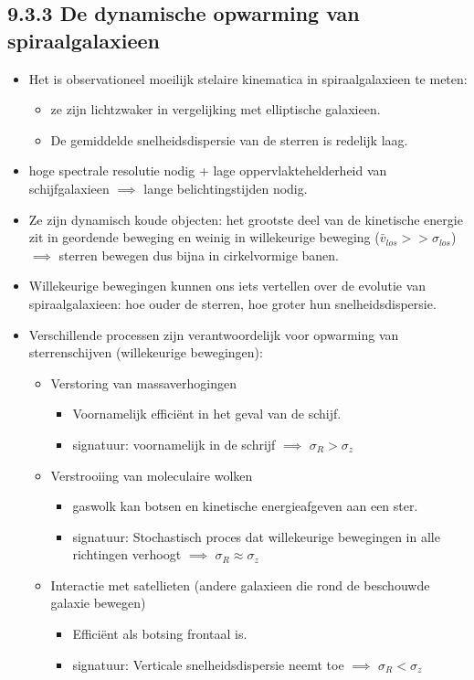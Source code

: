 \documentclass[10pt,a4paper]{article}
\begin{document}
\subsection*{9.3.3 De dynamische opwarming van spiraalgalaxieen}
\begin{itemize}
  \item Het is observationeel moeilijk stelaire kinematica in spiraalgalaxieen te meten:
  \begin{itemize}
    \item ze zijn lichtzwaker in vergelijking met elliptische galaxieen.
    \item  De gemiddelde snelheidsdispersie van de sterren is redelijk laag.
  \end{itemize} 
  \item hoge spectrale resolutie nodig + lage oppervlaktehelderheid van schijfgalaxieen $\implies$ lange belichtingstijden nodig.
  \item Ze zijn dynamisch koude objecten: het grootste deel van de kinetische energie zit in geordende beweging en weinig in willekeurige beweging ($\bar{v}_{los}>>\sigma_{los}$) $\implies$ sterren bewegen dus bijna in cirkelvormige banen.
  \item Willekeurige bewegingen kunnen ons iets vertellen over de evolutie van spiraalgalaxieen: hoe ouder de sterren, hoe groter hun snelheidsdispersie.
  \item Verschillende processen zijn verantwoordelijk voor opwarming van sterrenschijven (willekeurige bewegingen):
  \begin{itemize}
    \item Verstoring van massaverhogingen
    \begin{itemize}
      \item Voornamelijk efficiënt in het geval van de schijf.
      \item signatuur: voornamelijk in de schrijf $\implies$ $\sigma_R>\sigma_z$
    \end{itemize}
    \item Verstrooiing van moleculaire wolken
    \begin{itemize}
      \item gaswolk kan botsen en kinetische energieafgeven aan een ster.
      \item signatuur: Stochastisch proces dat willekeurige bewegingen in alle richtingen verhoogt $\implies$ $\sigma_R\approx\sigma_z$
    \end{itemize}
    \item Interactie met satellieten (andere galaxieen die rond de beschouwde galaxie bewegen)
    \begin{itemize}
      \item Efficiënt als botsing frontaal is.
      \item signatuur: Verticale snelheidsdispersie neemt toe $\implies$ $\sigma_R<\sigma_z$
    \end{itemize}
  \end{itemize}
\end{itemize}
\end{document}
